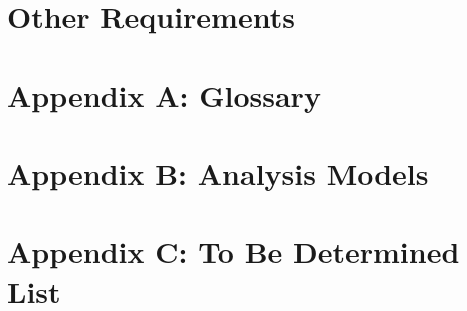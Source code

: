 \documentclass[titlepage]{article}
\begin{document}
\section{Other Requirements}

\appendix
\section{Appendix A: Glossary}
\section{Appendix B: Analysis Models}
\section{Appendix C: To Be Determined List}
\end{document}
